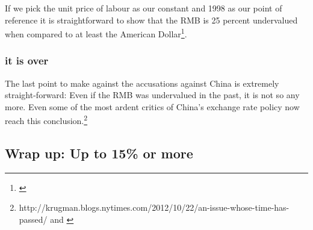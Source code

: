 If we pick the unit price of labour as our constant and 1998 as our 
point of reference it is straightforward to show that the RMB is 25 
percent undervalued when compared to at least the American 
Dollar\footnote{\cite{chimerica2009}}. 








\subsubsection{it is over}

The last point to make against the accusations against China is extremely straight-forward: Even if the RMB was undervalued in the past, it is not so any more. Even some of the most ardent critics of China's exchange rate policy now reach this conclusion.\footnote{\cite{Krugman2012}http://krugman.blogs.nytimes.com/2012/10/22/an-issue-whose-time-has-passed/ and \cite{ClineWilliamson2012}} %



\subsection{Wrap up: Up to 15\% or more}



%

